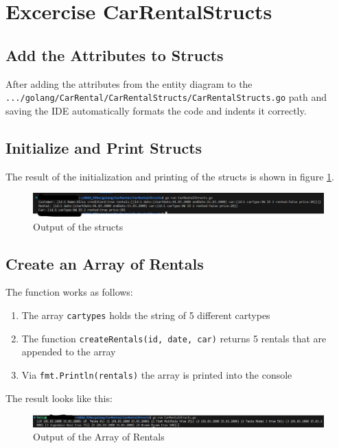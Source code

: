 \section{Excercise CarRentalStructs}
\label{sec:car_rental_structs}

\subsection*{Add the Attributes to Structs}
After adding the attributes from the entity diagram to the 
\texttt{.../golang/CarRental/CarRentalStructs/CarRentalStructs.go} path and saving
the IDE automatically formats the code and indents it correctly.

\subsection*{Initialize and Print Structs}
The result of the initialization and printing of the structs is shown in figure \ref{fig:car_rental_structs}.
\begin{figure}[H]
    \centering
    \includegraphics[width=\textwidth]{figures/goLang/carRental/carRental_structs.png}
    \caption{Output of the structs}
    \label{fig:car_rental_structs}
\end{figure}

\subsection*{Create an Array of Rentals}
The function works as follows:
\begin{enumerate}
    \item The array \texttt{cartypes} holds the string of 5 different cartypes
    \item The function \texttt{createRentals(id, date, car)} returns 5 rentals that are appended to the array
    \item Via \texttt{fmt.Println(rentals)} the array is printed into the console
\end{enumerate}

The result looks like this:
\begin{figure}
    \centering
    \includegraphics{figures/goLang/carRental/carRental_arrayFiveRentals.png}
    \caption{Output of the Array of Rentals}
    \label{fig:car_rental_array_five_rentals}
\end{figure}

